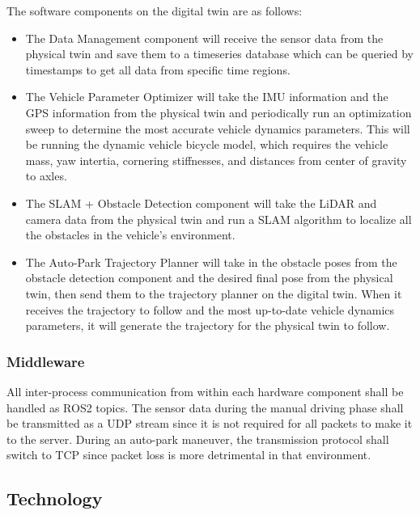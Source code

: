 The software components on the digital twin are as follows:

\begin{itemize}
    \item The Data Management component will receive the sensor data from the physical twin and save them to a timeseries database which can be queried by timestamps to get all data from specific time regions.
    \item The Vehicle Parameter Optimizer will take the IMU information and the GPS information from the physical twin and periodically run an optimization sweep to determine the most accurate vehicle dynamics parameters. This will be running the dynamic vehicle bicycle model, which requires the vehicle mass, yaw intertia, cornering stiffnesses, and distances from center of gravity to axles. 
    \item The SLAM + Obstacle Detection component will take the LiDAR and camera data from the physical twin and run a SLAM algorithm to localize all the obstacles in the vehicle's environment.
    \item The Auto-Park Trajectory Planner will take in the obstacle poses from the obstacle detection component and the desired final pose from the physical twin, then send them to the trajectory planner on the digital twin. When it receives the trajectory to follow and the most up-to-date vehicle dynamics parameters, it will generate the trajectory for the physical twin to follow.
\end{itemize}

\subsubsection{Middleware}

All inter-process communication from within each hardware component shall be handled as ROS2 topics. The sensor data during the manual driving phase shall be transmitted as a UDP stream since it is not required for all packets to make it to the server. During an auto-park maneuver, the transmission protocol shall switch to TCP since packet loss is more detrimental in that environment.

\subsection{Technology}


